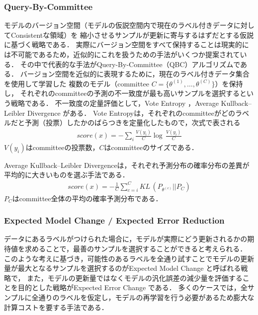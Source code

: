 \subsubsection{Query-By-Committee \cite{seung1992query}}
モデルのバージョン空間（モデルの仮説空間内で現在のラベル付きデータに対してConsistentな領域）を
縮小させるサンプルが更新に寄与するはずだとする仮説に基づく戦略である．
実際にバージョン空間をすべて保持することは現実的には不可能であるため，近似的にこれを扱うための手法がいくつか提案されている．
その中で代表的な手法がQuery-By-Committee（QBC）アルゴリズム\cite{seung1992query}である．
バージョン空間を近似的に表現するために，現在のラベル付きデータ集合を使用して学習した
複数のモデル（committee $C=\{ \theta^{(1)}, \dots, \theta^{(C)}\}$）を保持し，
それぞれのcommitteeの予測の不一致度が最も高いサンプルを選択するという戦略である．
不一致度の定量評価として，Vote Entropy \cite{dagan1995committee}，Average Kullback–Leibler Divergence \cite{mccallum1998employing}がある．
Vote Entropyは，それぞれのcommitteeがどのラベルだと予測（投票）したかのばらつきを定量化したもので，次式で表される
\begin{eqnarray}
    score(x) =  - \sum_i \frac{V(y_i)}{C} \log \, \frac{V(y_i)}{C}
\end{eqnarray}
$V(y_i)$はcommitteeの投票数，$C$はcommitteeのサイズである．

Average Kullback–Leibler Divergenceは，それぞれ予測分布の確率分布の差異が平均的に大きいものを選ぶ手法である．
\begin{eqnarray}
    score(x) =  -  \frac{1}{C} \sum_{c=i}^C KL \, (P_{\theta^{(c)}} || P_C)
\end{eqnarray}
$P_C$はcommittee全体の平均の確率予測分布である．

\subsubsection{Expected Model Change \cite{settles2008multiple} / Expected Error Reduction \cite{roy2001toward}}
データにあるラベルがつけられた場合に，モデルが実際にどう更新されるかの期待値を求めることで，最善のサンプルを選択することができると考えられる．
このような考えに基づき，可能性のあるラベルを全通り試すことでモデルの更新量が最大となるサンプルを選択するのがExpected Model Change \cite{settles2008multiple}と呼ばれる戦略で，
また，モデルの更新量ではなくモデルの汎化誤差の減少量を評価することを目的とした戦略がExpected Error Change \cite{roy2001toward}である．
多くのケースでは，全サンプルに全通りのラベルを仮定し，モデルの再学習を行う必要があるため膨大な計算コストを要する手法である．

